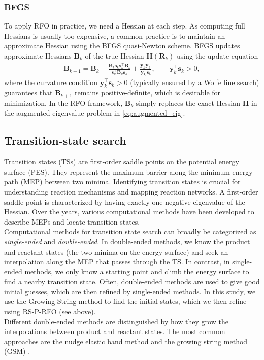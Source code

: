 \documentclass[pdflatex,sn-mathphys-num]{sn-jnl}%
\begin{document}
\subsubsection{BFGS}
\label{sec:bfgs}
To apply RFO in practice, we need a Hessian at each step. As computing full Hessians is usually too expensive, a common practice is to maintain an approximate Hessian using the BFGS quasi-Newton scheme. BFGS updates approximate Hessians $\mathbf{B}_k$ of the true Hessian $\mathbf{H}(\mathbf{R}_k)$ using the update equation
\begin{align}
    \mathbf{B}_{k+1} = \mathbf{B}_k 
    - \frac{\mathbf{B}_k \mathbf{s}_k \mathbf{s}_k^\top \mathbf{B}_k}{\mathbf{s}_k^\top \mathbf{B}_k \mathbf{s}_k}
    + \frac{\mathbf{y}_k \mathbf{y}_k^\top}{\mathbf{y}_k^\top \mathbf{s}_k},
    \qquad \mathbf{y}_k^\top \mathbf{s}_k > 0,
\end{align}
where the curvature condition $\mathbf{y}_k^\top \mathbf{s}_k>0$ (typically ensured by a Wolfe line search) guarantees that $\mathbf{B}_{k+1}$ remains positive-definite, which is desirable for minimization. In the RFO framework, $\mathbf{B}_k$ simply replaces the exact Hessian $\mathbf{H}$ in the augmented eigenvalue problem in \eqref{eq:augmented_eig}.

\subsection{Transition-state search \label{sec:tssearchliterature}}
Transition states (TSs) are first-order saddle points on the potential energy surface (PES). They represent the maximum barrier along the minimum energy path (MEP) between two minima. Identifying transition states is crucial for understanding reaction mechanisms and mapping reaction networks. A first-order saddle point is characterized by having exactly one negative eigenvalue of the Hessian. Over the years, various computational methods have been developed to describe MEPs and locate transition states. \\
Computational methods for transition state search can broadly be categorized as \textit{single-ended} and \textit{double-ended}. In double-ended methods, we know the product and reactant states (the two minima on the energy surface) and seek an interpolation along the MEP that passes through the TS. In contrast, in single-ended methods, we only know a starting point and climb the energy surface to find a nearby transition state. Often, double-ended methods are used to give good initial guesses, which are then refined by single-ended methods. In this study, we use the Growing String method to find the initial states, which we then refine using RS-P-RFO (see above).\\
Different double-ended methods are distinguished by how they grow the interpolations between product and reactant states. The most common approaches are the nudge elastic band method \citep{henkelman1999, henkelman2000} and the growing string method (GSM) \citep{peters2004,zimmerman2015}. 
\end{document}
